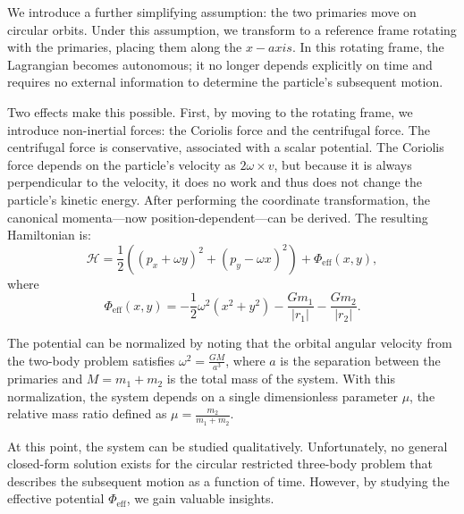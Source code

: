         We introduce a further simplifying assumption: the two primaries move on circular orbits. Under this assumption, we transform to a reference frame rotating with the primaries, placing them along the $x-axis$. In this rotating frame, the Lagrangian becomes autonomous; it no longer depends explicitly on time and requires no external information to determine the particle's subsequent motion.

        Two effects make this possible. First, by moving to the rotating frame, we introduce non-inertial forces: the Coriolis force and the centrifugal force. The centrifugal force is conservative, associated with a scalar potential. The Coriolis force depends on the particle's velocity as $2\omega\times v$, but because it is always perpendicular to the velocity, it does no work and thus does not change the particle's kinetic energy. After performing the coordinate transformation, the canonical momenta—now position-dependent—can be derived. The resulting Hamiltonian is:
        \begin{equation}
            \mathcal{H} = \frac{1}{2}\left(\left(p_x + \omega y\right)^2 + \left(p_y - \omega x\right)^2 \right) + \Phi_\mathrm{eff}(x,y),
        \end{equation}
        where
        \begin{equation}
            \Phi_\mathrm{eff}(x,y) = -\frac{1}{2} \omega^2 (x^2 + y^2) - \frac{G m_1}{|r_1|} - \frac{G m_2}{|r_2|}.
        \end{equation}

        The potential can be normalized by noting that the orbital angular velocity from the two-body problem satisfies \(\omega^2 = \frac{G M}{a^3}\), where \(a\) is the separation between the primaries and \(M = m_1 + m_2\) is the total mass of the system. With this normalization, the system depends on a single dimensionless parameter \(\mu\), the relative mass ratio defined as \(\mu = \frac{m_2}{m_1 + m_2}\).

        At this point, the system can be studied qualitatively. Unfortunately, no general closed-form solution exists for the circular restricted three-body problem that describes the subsequent motion as a function of time. However, by studying the effective potential \(\Phi_\mathrm{eff}\), we gain valuable insights.

